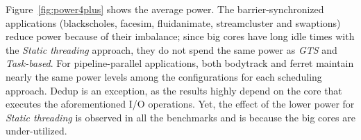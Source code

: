 Figure~\ref{fig:power4plus} shows the average power. The barrier-synchronized 
applications (blackscholes, facesim, fluidanimate, streamcluster and swaptions) reduce power because 
of their imbalance; since big cores have long idle times with the \emph{Static threading} approach, 
they do not spend the same power as \emph{GTS} and \emph{Task-based}.
For pipeline-parallel applications, both bodytrack and ferret maintain nearly the same 
power levels among the configurations for each scheduling approach. Dedup is an exception, as the 
results highly depend on the core that executes the aforementioned I/O operations. Yet, the 
effect of the lower power for \emph{Static threading} is observed in all the benchmarks and is 
because the big cores are under-utilized. %









